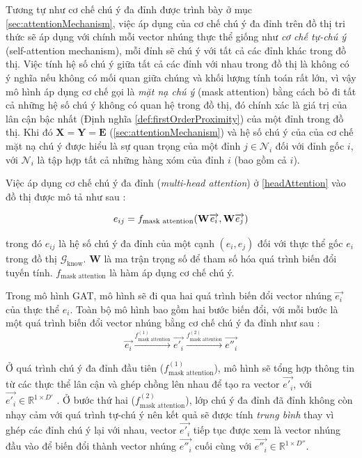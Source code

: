 Tương tự như cơ chế chú ý đa đỉnh được trình bày ở mục \ref{sec:attentionMechanism}, việc áp dụng của cơ chế chú ý đa đỉnh trên đồ thị tri thức sẽ áp dụng với chính mỗi vector nhúng thực thể giống như \textit{cơ chế tự-chú ý} (self-attention mechanism), mỗi đỉnh sẽ chú ý với tất cả các đỉnh khác trong đồ thị. Việc tính hệ số chú ý giữa tất cả các đỉnh với nhau trong đồ thị là không có ý nghĩa nếu không có mối quan giữa chúng và khối lượng tính toán rất lớn, vì vậy mô hình áp dụng cơ chế gọi là \textit{mặt nạ chú ý} (mask attention) bằng cách bỏ đi tất cả những hệ số chú ý không có quan hệ trong đồ thị, đó chính xác là giá trị của lân cận bậc nhất (Định nghĩa \ref{def:firstOrderProximity}) của một đỉnh trong đồ thị. Khi đó $\mathbf{X} = \mathbf{Y} = \mathbf{E}$ (\ref{sec:attentionMechanism}) và hệ số chú ý của của cơ chế mặt nạ chú ý được hiểu là sự quan trọng của một đỉnh $j \in \mathcal{N}_{i}$ đối với đỉnh gốc $i$, với $\mathcal{N}_{i}$ là tập hợp tất cả những hàng xóm của đỉnh $i$ (bao gồm cả $i$). 

Việc áp dụng cơ chế chú ý đa đỉnh (\textit{multi-head attention}) ở \ref{headAttention} vào đồ thị được mô tả như sau :

\begin{equation}
\label{maskAttention}
\centering
{e_{ij}}={f_{\text{mask attention}}(\mathbf{W} \overrightarrow{e_i}, \mathbf{W} \overrightarrow{e_j})}
\end{equation}

trong đó $e_{ij}$ là hệ số chú ý đa đỉnh của một cạnh $(e_i, e_j)$ đối với thực thể gốc $e_i$ trong đồ thị $\mathcal{G}_{\text{know}}$. $\mathbf{W}$ là ma trận trọng số để tham số hóa quá trình biến đổi tuyến tính. $f_{\text{mask attention}}$ là hàm áp dụng cơ chế chú ý.

Trong mô hình GAT, mô hình sẽ đi qua hai quá trình biến đổi vector nhúng $\overrightarrow{e_i}$ của thực thể $e_i$. Toàn bộ mô hình bao gồm hai bước biến đổi, với mỗi bước là một quá trình biến đổi vector nhúng bằng cơ chế chú ý đa đỉnh như sau :
\begin{equation}
\label{gatProcess}
\overrightarrow{e_i} \xrightarrow{f_{\text{mask attention}}^{(1)}} \overrightarrow{e'_i} \xrightarrow{f_{\text{mask attention}}^{(2)}} \overrightarrow{e''_i}
\end{equation}

Ở quá trình chú ý đa đỉnh đầu tiên ($f_{\text{mask attention}}^{(1)}$), mô hình sẽ tổng hợp thông tin từ các thực thể lân cận và ghép chồng lên nhau để tạo ra vector $\overrightarrow{e'_i}$, với $\overrightarrow{e'_i} \in \mathbb{R}^{1 \times D'}$ . Ở bước thứ hai ($f_{\text{mask attention}}^{(2)}$), lớp chú ý đa đỉnh đã đỉnh không còn nhạy cảm với quá trình tự-chú ý nên kết quả sẽ được tính \textit{trung bình} thay vì ghép các đỉnh chú ý lại với nhau, vector $\overrightarrow{e'_i}$ tiếp tục được xem là vector nhúng đầu vào để biến đổi thành vector nhúng $\overrightarrow{e''_i}$ cuối cùng với $\overrightarrow{e''_i} \in \mathbb{R}^{1 \times D''}$.

